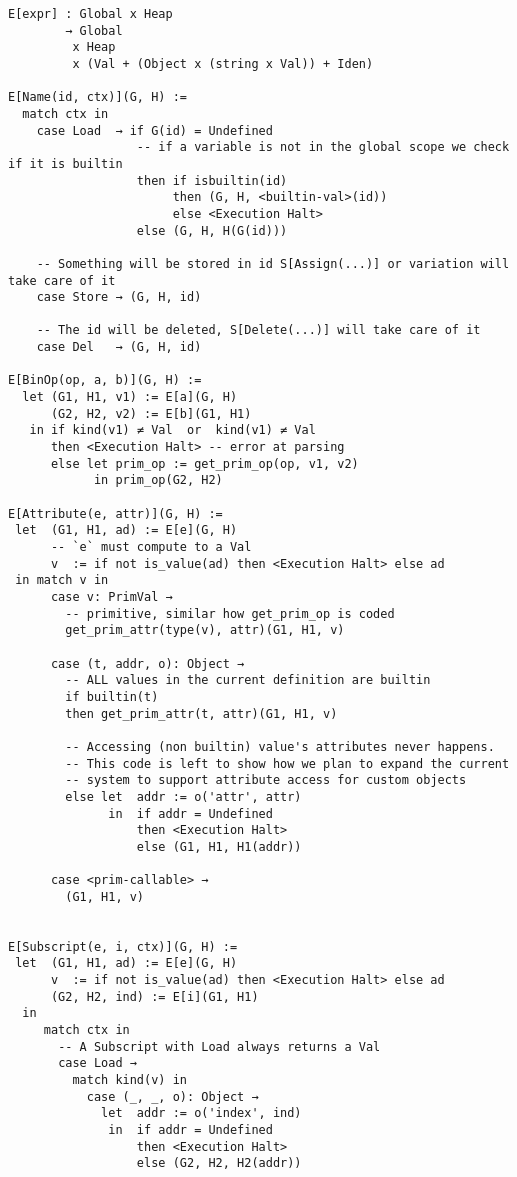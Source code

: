 \begin{verbatim}
E[expr] : Global x Heap
        → Global
         x Heap
         x (Val + (Object x (string x Val)) + Iden)

E[Name(id, ctx)](G, H) :=
  match ctx in
    case Load  → if G(id) = Undefined
                  -- if a variable is not in the global scope we check if it is builtin
                  then if isbuiltin(id)
                       then (G, H, <builtin-val>(id))
                       else <Execution Halt>
                  else (G, H, H(G(id)))

    -- Something will be stored in id S[Assign(...)] or variation will take care of it
    case Store → (G, H, id)

    -- The id will be deleted, S[Delete(...)] will take care of it
    case Del   → (G, H, id)

E[BinOp(op, a, b)](G, H) :=
  let (G1, H1, v1) := E[a](G, H)
      (G2, H2, v2) := E[b](G1, H1)
   in if kind(v1) ≠ Val  or  kind(v1) ≠ Val
      then <Execution Halt> -- error at parsing
      else let prim_op := get_prim_op(op, v1, v2)
            in prim_op(G2, H2)

E[Attribute(e, attr)](G, H) :=
 let  (G1, H1, ad) := E[e](G, H)
      -- `e` must compute to a Val
      v  := if not is_value(ad) then <Execution Halt> else ad
 in match v in
      case v: PrimVal →
        -- primitive, similar how get_prim_op is coded
        get_prim_attr(type(v), attr)(G1, H1, v)

      case (t, addr, o): Object →
        -- ALL values in the current definition are builtin
        if builtin(t)
        then get_prim_attr(t, attr)(G1, H1, v)

        -- Accessing (non builtin) value's attributes never happens.
        -- This code is left to show how we plan to expand the current
        -- system to support attribute access for custom objects
        else let  addr := o('attr', attr)
              in  if addr = Undefined
                  then <Execution Halt>
                  else (G1, H1, H1(addr))

      case <prim-callable> →
        (G1, H1, v)


E[Subscript(e, i, ctx)](G, H) :=
 let  (G1, H1, ad) := E[e](G, H)
      v  := if not is_value(ad) then <Execution Halt> else ad
      (G2, H2, ind) := E[i](G1, H1)
  in
     match ctx in
       -- A Subscript with Load always returns a Val
       case Load →
         match kind(v) in
           case (_, _, o): Object →
             let  addr := o('index', ind)
              in  if addr = Undefined
                  then <Execution Halt>
                  else (G2, H2, H2(addr))


\end{verbatim}
